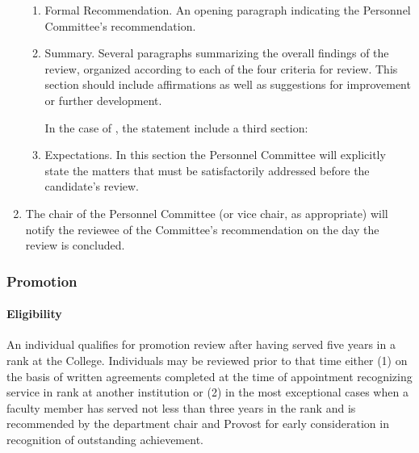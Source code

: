 \begin{enumerate}[label=\alph*)]
{						\begin{enumerate}[label=\arabic*)]
							\item{Formal Recommendation.  An opening paragraph indicating the Personnel Committee's recommendation.}
							\item{Summary.  Several paragraphs summarizing the overall findings of the review, organized according to each of the four criteria for review.  This section should include affirmations as well as suggestions for improvement or further development.}

							In the case of ,
							the statement  include a third section:

							\item{Expectations.  In this section the Personnel Committee will explicitly state the matters that must be satisfactorily addressed before the candidate's
								review.}
						\end{enumerate}
					}
					\item{  The chair of the Personnel Committee (or vice chair, as appropriate) will notify the reviewee of the Committee's recommendation on the day the review is concluded.}
				\end{enumerate}
		\subsubsection{Promotion}
			\paragraph{Eligibility}
				An individual qualifies for promotion review after having served five years in a rank at the College.  Individuals may be reviewed prior to that time either (1) on the basis of written agreements completed at the time of appointment recognizing service in rank at another institution or (2) in the most exceptional cases when a faculty member has served not less than three years in the rank and is recommended by the department chair and Provost for early consideration in recognition of outstanding achievement.
